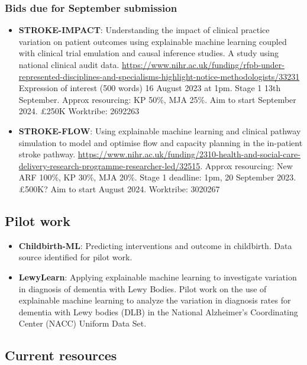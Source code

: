 \subsubsection{Bids due for September submission}

\begin{itemize}
    \item \textbf{STROKE-IMPACT}: Understanding the impact of clinical practice variation on patient outcomes using explainable machine learning coupled with clinical trial emulation and causal inference studies. A study using national clinical audit data. \url{https://www.nihr.ac.uk/funding/rfpb-under-represented-disciplines-and-specialisms-highlight-notice-methodologists/33231} Expression of interest (500 words) 16 August 2023 at 1pm. Stage 1 13th September. Approx resourcing: KP 50\%, MJA 25\%. Aim to start September 2024. £250K Worktribe: 2692263
    \item \textbf{STROKE-FLOW}: Using explainable machine learning and clinical pathway simulation to model and optimise flow and capacity planning in the in-patient stroke pathway. \url{https://www.nihr.ac.uk/funding/2310-health-and-social-care-delivery-research-programme-researcher-led/32515}. Approx resourcing: New ARF 100\%, KP 30\%, MJA 20\%. Stage 1 deadline: 1pm, 20 September 2023. £500K? Aim to start August 2024. Worktribe: 3020267
\end{itemize}

\subsection{Pilot work}

\begin{itemize}
    \item \textbf{Childbirth-ML}: Predicting interventions and outcome in childbirth. Data source identified for pilot work.
    
    \item \textbf{LewyLearn}: Applying explainable machine learning to investigate variation in diagnosis of dementia with Lewy Bodies. Pilot work on the use of explainable machine learning to analyze the variation in diagnosis rates for dementia with Lewy bodies (DLB) in the National Alzheimer’s Coordinating Center (NACC) Uniform Data Set.
    
\end{itemize}

\subsection{Current resources}

